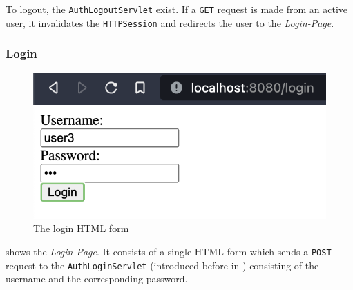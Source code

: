 To logout, the \texttt{AuthLogoutServlet} exist. If a \texttt{GET} request is made from an active user, it invalidates the \texttt{HTTPSession} and redirects the user to the \textit{Login-Page}.


\subsubsection{Login}\label{subsubsec:03_impl_servlets_login}
\begin{figure}[h]
\centering
\includegraphics[scale=0.5]{images/03_impl/login/login_form}
\caption{The login HTML form}
\label{fig:03_impl_servlets_login_form}
\end{figure}
 shows the \textit{Login-Page}. It consists of a single HTML form which sends a \texttt{POST} request to the \texttt{AuthLoginServlet} (introduced before in ) consisting of the username and the corresponding password.


